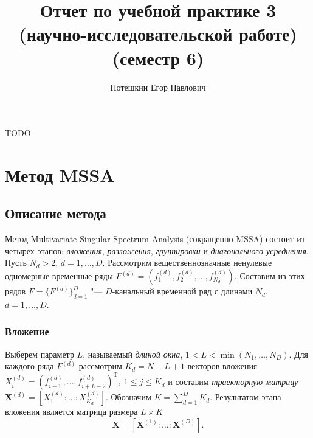 \documentclass[specialist,
substylefile = spbu_report.rtx,
subf,href,colorlinks=true, 12pt]{disser}
\newcommand{\traj}{\mathbf{X}}
\newcommand{\transponse}{^\mathrm{T}}
\theoremstyle{definition}
\begin{document}
	
	\title{Отчет по учебной практике 3 (научно-исследовательской работе) (семестр 6)}
	
	
	\author{Потешкин Егор Павлович}
	
	
	\date{\number\year}
	
	\maketitle
	\tableofcontents
	\intro
	TODO
	
	
	\chapter{Метод MSSA}
	\section{Описание метода}
	Метод Multivariate Singular Spectrum Analysis (сокращенно MSSA) состоит из четырех этапов: \textit{вложения}, \textit{разложения}, \textit{группировки} и \textit{диагонального усреднения}.
	Пусть $N_d>2$, $d=1,\ldots,D$. Рассмотрим вещественнозначные ненулевые одномерные временные ряды $F^{(d)}=(f_1^{(d)}, f_2^{(d)},\ldots, f_{N_d}^{(d)})$. Составим из этих рядов $F=\{F^{(d)}\}_{d=1}^D$ "--- $D$-канальный временной ряд с длинами $N_d$, $d=1,\dots,D$. 
	\subsection{Вложение}\label{sect:embedding}
	Выберем параметр $L$, называемый \textit{длиной окна}, $1<L<\min(N_1,\ldots,N_D)$. Для каждого ряда $F^{(d)}$ рассмотрим $K_d=N-L+1$ векторов вложения
	$X_i^{(d)}=(f_{i-1}^{(d)},\ldots, f_{i+L-2}^{(d)})\transponse,\ 1\leqslant j \leqslant K_d$ и составим \textit{траекторную матрицу} $\traj^{(d)}=[X_1^{(d)}:\ldots:X_{K_d}^{(d)}]$. Обозначим $K=\sum_{d=1}^D K_d$. Результатом этапа вложения является матрица размера $L\times K$
	\begin{equation}\label{eq:traj}
	\traj=[\traj^{(1)}:\ldots:\traj^{(D)}].
	\end{equation}
\end{document}
